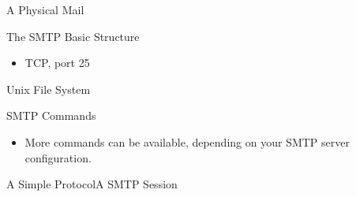 \begin{frame}{A Physical Mail}
  \centering
  \mode<beamer>{ \fbox{\texttt{[image: mail-letter]}} }%
  \label{fig:letter}
\end{frame}

\begin{frame}%
  \begin{iblock}{The SMTP Basic Structure}
    \begin{center}
    \end{center}
    \label{fig:smtp_model}
  \end{iblock}
  \begin{itemize}
  \item TCP, port 25
  \end{itemize}
\end{frame}

\begin{frame}{Unix File System}
  \centering
  \mode<beamer>{ \texttt{[image: cs3]} }%
  \label{fig:cs3}
\end{frame}

\begin{frame}%
  \begin{iblock}{SMTP Commands}
    \begin{center}
    \end{center}
  \end{iblock}
  \label{fig:smtp_cmds}
  \begin{itemize}
  \item More commands can be available, depending on your SMTP server configuration.
  \end{itemize}
\end{frame}
  
\begin{frame}{A Simple Protocol}{A SMTP Session}
  \centering
  \mode<beamer>{ \texttt{[image: smtp\_session]} }%
  \label{fig:smtp_session}
\end{frame}

